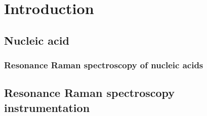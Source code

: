 \chapter{Introduction}

\section{Nucleic acid}

\subsection{Resonance Raman spectroscopy of nucleic acids}

\section{Resonance Raman spectroscopy instrumentation}
